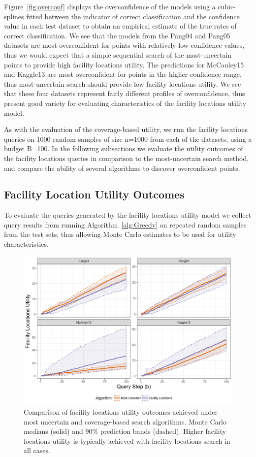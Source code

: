 \documentclass[letterpaper]{article} %
\begin{document}
Figure~\ref{fig:overconf} displays the overconfidence of the models using a cubic-splines fitted between the indicator of correct classification and the confidence value in each test dataset to obtain an empirical estimate of the true rates of correct classification. We see that the models from the Pang04 and Pang05 datasets are most overconfident for points with relatively low confidence values, thus we would expect that a simple sequential search of the most-uncertain points to provide high facility locations utility. The predictions for McCauley15 and Kaggle13 are most overconfident for points in the higher confidence range, thus most-uncertain search should provide low facility locations utility. We see that these four datasets represent fairly different profiles of overconfidence, thus present good variety for evaluating characteristics of the facility locations utility model. 

As with the evaluation of the coverage-based utility, we run the facility locations queries on 1000 random samples of size n=1000 from each of the datasets, using a budget B=100. In the following subsections we evaluate the utility outcomes of the facility locations queries in comparison to the most-uncertain search method, and compare the ability of several algorithms to discover overconfident points.

\subsection{Facility Location Utility Outcomes}

To evaluate the queries generated by the facility locations utility model we collect query results from running Algorithm~\ref{alg:Greedy} on repeated random samples from the test sets, thus allowing Monte Carlo estimates to be used for utility characteristics. 

\begin{figure}[t]
 \centering
  \includegraphics[width=\textwidth]{../experimentsAndPlots/flUtilPlaceholder.png}
  \caption{Comparison of facility locations utility outcomes achieved under most uncertain and coverage-based search algorithms. Monte Carlo medians (solid) and 90\% prediction bands (dashed).  Higher facility locations utility is typically achieved with facility locations search in all cases.}
  \label{fig:flutil}
\end{figure}
\end{document}
